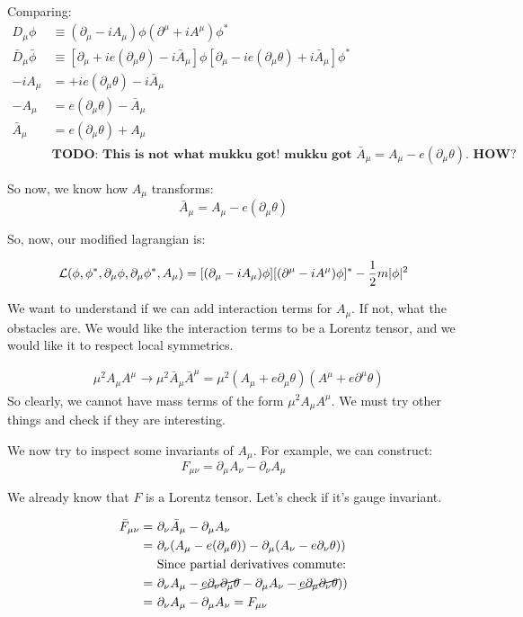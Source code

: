 Comparing:
\begin{align*}
    D_\mu \phi &\equiv (\partial_\mu - i A_\mu) \phi (\partial^\mu + i A^\mu) \phi^* \\
    \bar D_\mu \bar \phi &\equiv [\partial_\mu + i e (\partial_\mu \theta) - i \bar A_\mu  ]\phi
    [\partial_\mu  - i e (\partial_\mu \theta)  + i \bar A_\mu ] \phi^* \\
    -i A_\mu &= + i e (\partial_\mu \theta) - i \bar A_\mu \\
    -A_\mu &= e (\partial_\mu \theta) - \bar A_\mu \\
    \bar A_\mu &= e (\partial_\mu \theta) + A_\mu \\
   &\textbf{TODO: This is not what mukku got! mukku got $\bar A_\mu = A_\mu - e(\partial_\mu \theta)$. HOW?}
\end{align*}

So now, we know how $A_\mu$ transforms:
\begin{equation}
    \boxed{\bar A_\mu = A_\mu - e(\partial_\mu \theta)}
\end{equation}

So, now, our modified lagrangian is:

\begin{align*}
    \mathcal{L} (\phi, \phi^*, \partial_\mu \phi, \partial_\mu \phi^*, A_\mu) = 
    [(\partial_\mu - i A_\mu) \phi][(\partial^\mu - i A^\mu) \phi]^* - \frac{1}{2} m |\phi|^2
\end{align*}



We want to understand if we can add interaction terms for $A_\mu$. If not,
what the obstacles are. We would like the interaction terms to be a Lorentz
tensor, and we would like it to respect local symmetrics.

\begin{align*}
    &\mu^2 A_\mu A^\mu \to \mu^2 \bar A_\mu \bar A^\mu = \mu^2 (A_\mu + e \partial_\mu \theta) (A^\mu + e \partial^\mu \theta)
\end{align*}
So clearly, we cannot have mass terms of the form $\mu^2 A_\mu A^\mu$. We must
try other things and check if they are interesting.

We now try to inspect some invariants of $A_\mu$.  For example, we can
construct:
$$F_{\mu\nu} = \partial_\mu A_\nu - \partial_\nu A_\mu$$

We already know that $F$ is a Lorentz tensor. Let's check if it's gauge
invariant.

\begin{align*}
    \bar F_{\mu\nu} =~&\partial_\nu \bar A_\mu - \partial_\mu A_\nu \\
    =~&\partial_\nu(A_\mu - e (\partial_\mu \theta)) - \partial_\mu (A_\nu - e \partial_\nu \theta)) \\
      &\text{Since partial derivatives commute:} \\
    =~&\partial_\nu A_\mu - \cancel{e \partial_\nu \partial_\mu \theta} - \partial_\mu A_\nu - \cancel{e \partial_\mu \partial_\nu \theta})) \\
    =~&\partial_\nu A_\mu - \partial_\mu A_\nu = F_{\mu \nu}
\end{align*}

